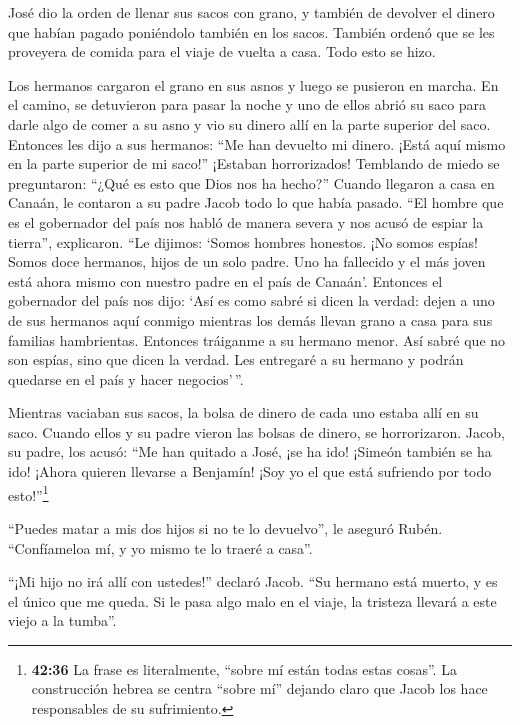  José dio la orden de llenar sus sacos con grano, y
también de devolver el dinero que habían pagado poniéndolo también en
los sacos. También ordenó que se les proveyera de comida para el viaje
de vuelta a casa. Todo esto se hizo.

 Los hermanos cargaron el grano en sus asnos y luego se
pusieron en marcha.  En el camino, se detuvieron para
pasar la noche y uno de ellos abrió su saco para darle algo de comer a
su asno y vio su dinero allí en la parte superior del saco.
 Entonces les dijo a sus hermanos: ``Me han devuelto mi
dinero. ¡Está aquí mismo en la parte superior de mi saco!'' ¡Estaban
horrorizados! Temblando de miedo se preguntaron: ``¿Qué es esto que Dios
nos ha hecho?''  Cuando llegaron a casa en Canaán, le
contaron a su padre Jacob todo lo que había pasado.  ``El
hombre que es el gobernador del país nos habló de manera severa y nos
acusó de espiar la tierra'', explicaron.  ``Le dijimos:
`Somos hombres honestos. ¡No somos espías!  Somos doce
hermanos, hijos de un solo padre. Uno ha fallecido y el más joven está
ahora mismo con nuestro padre en el país de Canaán'. 
Entonces el gobernador del país nos dijo: `Así es como sabré si dicen la
verdad: dejen a uno de sus hermanos aquí conmigo mientras los demás
llevan grano a casa para sus familias hambrientas. 
Entonces tráiganme a su hermano menor. Así sabré que no son espías, sino
que dicen la verdad. Les entregaré a su hermano y podrán quedarse en el
país y hacer negocios'\,''.

 Mientras vaciaban sus sacos, la bolsa de dinero de cada
uno estaba allí en su saco. Cuando ellos y su padre vieron las bolsas de
dinero, se horrorizaron.  Jacob, su padre, los acusó:
``Me han quitado a José, ¡se ha ido! ¡Simeón también se ha ido! ¡Ahora
quieren llevarse a Benjamín! ¡Soy yo el que está sufriendo por todo
esto!''\footnote{\textbf{42:36} La frase es literalmente, ``sobre mí
  están todas estas cosas''. La construcción hebrea se centra ``sobre
  mí'' dejando claro que Jacob los hace responsables de su sufrimiento.}

 ``Puedes matar a mis dos hijos si no te lo devuelvo'',
le aseguró Rubén. ``Confíameloa mí, y yo mismo te lo traeré a casa''.

 ``¡Mi hijo no irá allí con ustedes!'' declaró Jacob.
``Su hermano está muerto, y es el único que me queda. Si le pasa algo
malo en el viaje, la tristeza llevará a este viejo a la tumba''.

